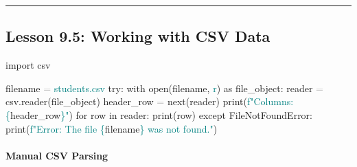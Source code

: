 \documentclass[
  justified,
  openright,
]{tufte-book}
\let\subsubsection\paragraph
\let\paragraph\paragraph
\newcommand{\BuiltInTok}[1]{#1}
\newcommand{\ControlFlowTok}[1]{\textcolor{BrandBlue}{#1}}
\newcommand{\ImportTok}[1]{\textcolor{BrandAccent}{#1}}
\newcommand{\KeywordTok}[1]{\textcolor{BrandBlue}{#1}}
\newcommand{\NormalTok}[1]{#1}
\newcommand{\OperatorTok}[1]{\textcolor{DarkGray}{#1}}
\newcommand{\PreprocessorTok}[1]{\textcolor{BrandAccent}{#1}}
\newcommand{\SpecialCharTok}[1]{\textcolor{Teal}{#1}}
\newcommand{\SpecialStringTok}[1]{\textcolor{Teal}{#1}}
\newcommand{\StringTok}[1]{\textcolor{Teal}{#1}}
\newenvironment{Shaded}{%
  \begin{snugshade}
}{%
  \end{snugshade}
}
\let\subsubsection\paragraph
\let\paragraph\paragraph
\begin{document}
\begin{center}\rule{0.5\linewidth}{0.5pt}\end{center}

\subsection{Lesson 9.5: Working with CSV
Data}\label{lesson-9.5-working-with-csv-data}

\begin{Shaded}
\begin{Highlighting}[]
\ImportTok{import}\NormalTok{ csv}

\NormalTok{filename }\OperatorTok{=} \StringTok{\textquotesingle{}students.csv\textquotesingle{}}
\ControlFlowTok{try}\NormalTok{:}
    \ControlFlowTok{with} \BuiltInTok{open}\NormalTok{(filename, }\StringTok{\textquotesingle{}r\textquotesingle{}}\NormalTok{) }\ImportTok{as}\NormalTok{ file\_object:}
\NormalTok{        reader }\OperatorTok{=}\NormalTok{ csv.reader(file\_object)}
\NormalTok{        header\_row }\OperatorTok{=} \BuiltInTok{next}\NormalTok{(reader)}
        \BuiltInTok{print}\NormalTok{(}\SpecialStringTok{f"Columns: }\SpecialCharTok{\{}\NormalTok{header\_row}\SpecialCharTok{\}}\SpecialStringTok{"}\NormalTok{)}
        \ControlFlowTok{for}\NormalTok{ row }\KeywordTok{in}\NormalTok{ reader:}
            \BuiltInTok{print}\NormalTok{(row)}
\ControlFlowTok{except} \PreprocessorTok{FileNotFoundError}\NormalTok{:}
    \BuiltInTok{print}\NormalTok{(}\SpecialStringTok{f"Error: The file }\SpecialCharTok{\{}\NormalTok{filename}\SpecialCharTok{\}}\SpecialStringTok{ was not found."}\NormalTok{)}
\end{Highlighting}
\end{Shaded}

\subsubsection{Manual CSV Parsing}\label{manual-csv-parsing}
\end{document}
